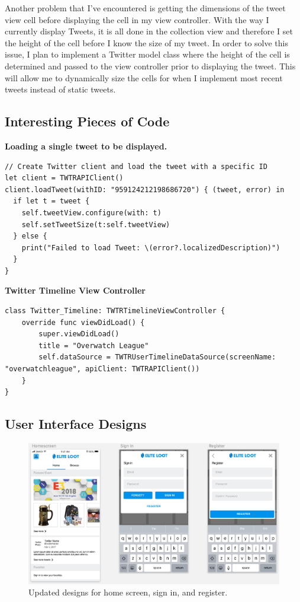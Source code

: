 \documentclass[onecolumn, draftclsnofoot,10pt, compsoc]{IEEEtran}
\begin{document}
Another problem that I’ve encountered is getting the dimensions of the tweet view cell before displaying the cell in my view controller. With the way I currently display Tweets, it is all done in the collection view and therefore I set the height of the cell before I know the size of my tweet. In order to solve this issue, I plan to implement a Twitter model class where the height of the cell is determined and passed to the view controller prior to displaying the tweet. This will allow me to dynamically size the cells for when I implement most recent tweets instead of static tweets. 
\subsection{Interesting Pieces of Code}
\noindent\textbf{Loading a single tweet to be displayed.}
\begin{lstlisting}
// Create Twitter client and load the tweet with a specific ID
let client = TWTRAPIClient()
client.loadTweet(withID: "959124212198686720") { (tweet, error) in
  if let t = tweet {
    self.tweetView.configure(with: t)
    self.setTweetSize(t:self.tweetView)
  } else {
    print("Failed to load Tweet: \(error?.localizedDescription)")
  }
}
\end{lstlisting}
\noindent\textbf{Twitter Timeline View Controller}
\begin{lstlisting}
class Twitter_Timeline: TWTRTimelineViewController {
    override func viewDidLoad() {
        super.viewDidLoad()
        title = "Overwatch League"
        self.dataSource = TWTRUserTimelineDataSource(screenName: 
"overwatchleague", apiClient: TWTRAPIClient())
    }
}
\end{lstlisting}

\subsection{User Interface Designs}
\begin{figure}[H]
\centering
\captionsetup{justification=centering}
\includegraphics[scale=.50]{homescreen}
\caption{Updated designs for home screen, sign in, and register.}
\end{figure}
\end{document}
